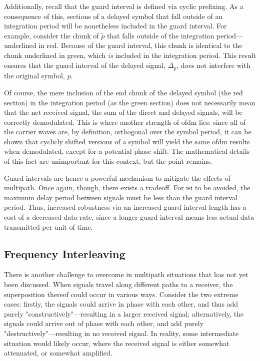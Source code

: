 \documentclass[class=report,11pt,crop=false]{standalone}
\begin{document}
Additionally, recall that the guard interval is defined via cyclic prefixing. As a consequence of this, sections of a delayed symbol that fall outside of an integration period will be nonetheless included in the guard interval. For example, consider the chunk of \(\tilde{p}\) that falls outside of the integration period---underlined in red. Because of the guard interval, this chunk is identical to the chunk underlined in green, which \emph{is} included in the integration period. This result ensures that the guard interval of the delayed signal, \(\Delta_{\tilde{p}}\), does not interfere with the original symbol, \(p\).

Of course, the mere inclusion of the end chunk of the delayed symbol (the red section) in the integration period (as the green section) does not necessarily mean that the net received signal, the sum of the direct and delayed signals, will be correctly demodulated. This is where another strength of \gls{ofdm} lies: since all of the carrier waves are, by definition, orthogonal over the symbol period, it can be shown that cyclicly shifted versions of a symbol will yield the same \gls{ofdm} results when demodulated, except for a potential phase-shift. The mathematical details of this fact are unimportant for this context, but the point remains.

Guard intervals are hence a powerful mechanism to mitigate the effects of multipath. Once again, though, there exists a tradeoff. For \gls{isi} to be avoided, the maximum delay period between signals must be less than the guard interval period. Thus, increased robustness via an increased guard interval length has a cost of a decreased data-rate, since a longer guard interval means less actual data transmitted per unit of time.

\subsection{Frequency Interleaving}
There is another challenge to overcome in multipath situations that has not yet been discussed. When signals travel along different paths to a receiver, the superposition thereof could occur in various ways. Consider the two extreme cases: firstly, the signals could arrive in phase with each other, and thus add purely "constructively"---resulting in a larger received signal; alternatively, the signals could arrive out of phase with each other, and add purely "destructively"---resulting in no received signal. In reality, some intermediate situation would likely occur, where the received signal is either somewhat attenuated, or somewhat amplified.
\end{document}
